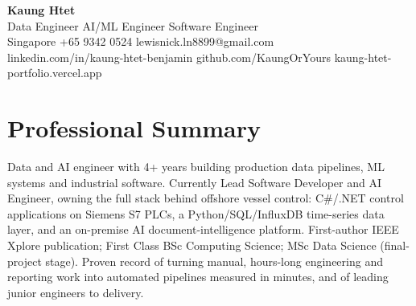 \documentclass[letterpaper,10pt]{article}
\begin{document}
{\LARGE\bfseries Kaung Htet}\\[3pt]
Data Engineer \textbar{} AI/ML Engineer \textbar{} Software Engineer\\[3pt]
Singapore \textbar{} +65 9342 0524 \textbar{} lewisnick.ln8899@gmail.com\\
linkedin.com/in/kaung-htet-benjamin \textbar{} github.com/KaungOrYours \textbar{} kaung-htet-portfolio.vercel.app

\section*{Professional Summary}
Data and AI engineer with 4+ years building production data pipelines, ML systems and
industrial software. Currently Lead Software Developer and AI Engineer, owning the full
stack behind offshore vessel control: C\#/.NET control applications on Siemens S7 PLCs,
a Python/SQL/InfluxDB time-series data layer, and an on-premise AI document-intelligence
platform. First-author IEEE Xplore publication; First Class BSc Computing Science; MSc Data
Science (final-project stage). Proven record of turning manual, hours-long engineering and
reporting work into automated pipelines measured in minutes, and of leading junior
engineers to delivery.

\end{document}
